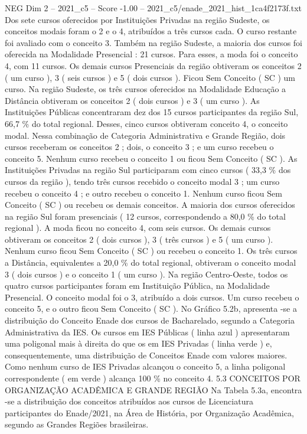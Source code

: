 \begin{textsample}{NEG Dim 2 – 2021\_c5 – Score -1.00 – 2021\_c5/enade\_2021\_hist\_1ca4f2173f.txt}
Dos sete cursos oferecidos por Instituições Privadas na região Sudeste, os conceitos modais foram o 2 e o 4, atribuídos a três cursos cada.
O curso restante foi avaliado com o conceito 3.
Também na região Sudeste, a maioria dos cursos foi oferecida na Modalidade Presencial : 21 cursos.
Para esses, a moda foi o conceito 4, com 11 cursos.
Os demais cursos Presenciais da região obtiveram os conceitos 2 ( um curso ), 3 ( seis cursos ) e 5 ( dois cursos ).
Ficou Sem Conceito ( SC ) um curso.
Na região Sudeste, os três cursos oferecidos na Modalidade Educação a Distância obtiveram os conceitos 2 ( dois cursos ) e 3 ( um curso ).
As Instituições Públicas concentraram dez dos 15 cursos participantes da região Sul, 66,7 \% do total regional.
Desses, cinco cursos obtiveram conceito 4, o conceito modal.
Nessa combinação de Categoria Administrativa e Grande Região, dois cursos receberam os conceitos 2 ; dois, o conceito 3 ; e um curso recebeu o conceito 5.
Nenhum curso recebeu o conceito 1 ou ficou Sem Conceito ( SC ).
As Instituições Privadas na região Sul participaram com cinco cursos ( 33,3 \% dos cursos da região ), tendo três cursos recebido o conceito modal 3 ; um curso recebeu o conceito 4 ; e outro recebeu o conceito 1.
Nenhum curso ficou Sem Conceito ( SC ) ou recebeu os demais conceitos.
A maioria dos cursos oferecidos na região Sul foram presenciais ( 12 cursos, correspondendo a 80,0 \% do total regional ).
A moda ficou no conceito 4, com seis cursos.
Os demais cursos obtiveram os conceitos 2 ( dois cursos ), 3 ( três cursos ) e 5 ( um curso ).
Nenhum curso ficou Sem Conceito ( SC ) ou recebeu o conceito 1.
Os três cursos a Distância, equivalentes a 20,0 \% do total regional, obtiveram o conceito modal 3 ( dois cursos ) e o conceito 1 ( um curso ).
Na região Centro-Oeste, todos os quatro cursos participantes foram em Instituição Pública, na Modalidade Presencial.
O conceito modal foi o 3, atribuído a dois cursos.
Um curso recebeu o conceito 5, e o outro ficou Sem Conceito ( SC ).
No Gráfico 5.2b, apresenta -se a distribuição do Conceito Enade dos cursos de Bacharelado, segundo a Categoria Administrativa da IES.
Os cursos em IES Públicas ( linha azul ) apresentaram uma poligonal mais à direita do que os em IES Privadas ( linha verde ) e, consequentemente, uma distribuição de Conceitos Enade com valores maiores.
Como nenhum curso de IES Privadas alcançou o conceito 5, a linha poligonal correspondente ( em verde ) alcança 100 \% no conceito 4. 5.3 CONCEITOS POR ORGANIZAÇÃO ACADÊMICA E GRANDE REGIÃO Na Tabela 5.3a, encontra -se a distribuição dos conceitos atribuídos aos cursos de Licenciatura participantes do Enade/2021, na Área de História, por Organização Acadêmica, segundo as Grandes Regiões brasileiras.

\end{textsample}
